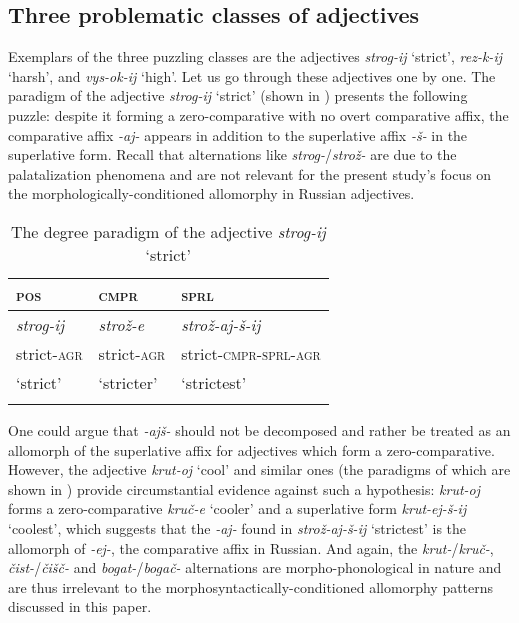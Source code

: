 \documentclass[output=paper,colorlinks,citecolor=brown]{langscibook}
\begin{document}
\subsection{Three problematic classes of adjectives}

Exemplars of the three puzzling classes are the adjectives \textit{strog-ij} `strict', \textit{rez-k-ij} `harsh', and \textit{vys-ok-ij} `high'. Let us go through these adjectives one by one. The paradigm of the adjective \textit{strog-ij} `strict' (shown in ) presents the following puzzle: despite it forming a zero-comparative with no overt comparative affix, the comparative affix \textit{-aj-} appears in addition to the superlative affix \textit{-š-} in the superlative form. Recall that alternations like \textit{strog-}/\textit{strož-} are due to the palatalization phenomena \citep{Blumenfeld:2003} and are not relevant for the present study's focus on the morphologically-conditioned allomorphy in Russian adjectives.

\begin{table}
\caption{The degree paradigm of the adjective \textit{strog-ij} `strict'}
\label{kas:tab:strict:paradigm}
 \begin{tabularx}{.8\textwidth}{QQl}
  \lsptoprule
        \textsc{pos}   &\textsc{cmpr}  & \textsc{sprl} \\
  \midrule
        \textit{strog-ij} &\textit{strož-e} &\textit{strož-aj-š-ij} \\
        {strict-\textsc{agr}} & {strict-\textsc{agr}} & {strict-\textsc{cmpr-sprl-agr}}  \\
        {`strict'} & {`stricter'} & {`strictest'}\\
  \lspbottomrule
 \end{tabularx}
\end{table}

One could argue that \textit{-ajš-} should not be decomposed and rather be treated as an allomorph of the superlative affix for adjectives which form a zero-com\-pa\-ra\-tive. However, the adjective \textit{krut-oj} `cool' and similar ones (the paradigms of which are shown in ) provide circumstantial evidence against such a hypothesis: \textit{krut-oj} forms a zero-comparative \textit{kruč-e} `cooler' and a superlative form \textit{krut-ej-š-ij} `coolest', which suggests that the \textit{-aj-} found in \textit{strož-aj-š-ij} `strictest' is the allomorph of \textit{-ej-}, the comparative affix in Russian. And again, the \textit{krut-}/\textit{kruč-}, \textit{čist-}/\textit{čišč-} and \textit{bogat-}/\textit{bogač-} alternations are morpho-phonological in nature and are thus irrelevant to the morphosyntactically-conditioned allomorphy patterns discussed in this paper.
\end{document}

